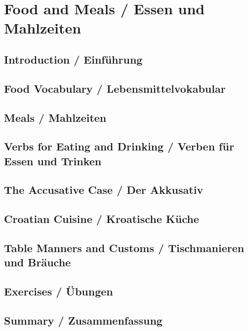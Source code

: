 \chapter{Food and Meals / Essen und Mahlzeiten}

\section{Introduction / Einführung}

\section{Food Vocabulary / Lebensmittelvokabular}

\section{Meals / Mahlzeiten}

\section{Verbs for Eating and Drinking / Verben für Essen und Trinken}

\section{The Accusative Case / Der Akkusativ}

\section{Croatian Cuisine / Kroatische Küche}

\section{Table Manners and Customs / Tischmanieren und Bräuche}

\section{Exercises / Übungen}

\section{Summary / Zusammenfassung}
